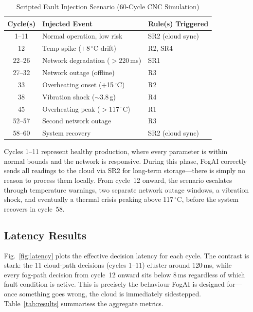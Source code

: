 \documentclass[conference]{IEEEtran}
\begin{document}
\begin{table}[t]
\caption{Scripted Fault Injection Scenario (60-Cycle CNC Simulation)}
\label{tab:scenario}
\centering
\small
\setlength{\tabcolsep}{3pt}
\begin{tabular}{@{}cll@{}}
\toprule
\textbf{Cycle(s)} & \textbf{Injected Event} & \textbf{Rule(s) Triggered} \\
\midrule
1--11   & Normal operation, low risk      & SR2 (cloud sync)     \\
12      & Temp spike ($+$8\,$^\circ$C drift)  & R2, SR4           \\
22--26  & Network degradation ($>$220\,ms)   & SR1               \\
27--32  & Network outage (offline)            & R3                \\
33      & Overheating onset ($+$15\,$^\circ$C)& R2                \\
38      & Vibration shock ($\sim$3.8\,g)      & R4                \\
45      & Overheating peak ($>$117\,$^\circ$C) & R1               \\
52--57  & Second network outage               & R3                \\
58--60  & System recovery                     & SR2 (cloud sync)  \\
\bottomrule
\end{tabular}
\end{table}

Cycles 1--11 represent healthy production, where every parameter is
within normal bounds and the network is responsive.
During this phase, FogAI correctly sends all readings to the cloud
via SR2 for long-term storage---there is simply no reason to process
them locally.
From cycle~12 onward, the scenario escalates through temperature
warnings, two separate network outage windows, a vibration shock, and
eventually a thermal crisis peaking above 117\,$^\circ$C, before the
system recovers in cycle~58.

\subsection{Latency Results}

Fig.~\ref{fig:latency} plots the effective decision latency for each
cycle.
The contrast is stark: the 11 cloud-path decisions (cycles 1--11)
cluster around 120\,ms, while every fog-path decision from cycle~12
onward sits below 8\,ms regardless of which fault condition is active.
This is precisely the behaviour FogAI is designed for---once something
goes wrong, the cloud is immediately sidestepped.
Table~\ref{tab:results} summarises the aggregate metrics.
\end{document}
